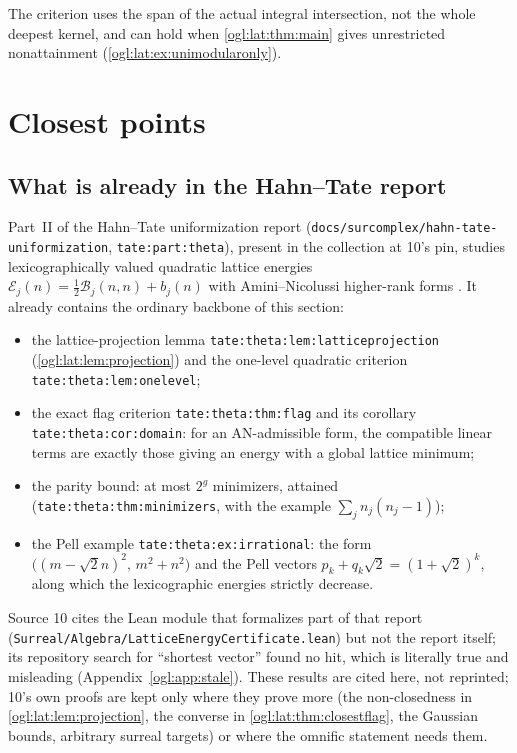 \documentclass[11pt,oneside]{article}
\numberwithin{equation}{section}
\theoremstyle{definition}
\theoremstyle{remark}
\newcommand{\cE}{\mathcal E}
\newcommand{\cB}{\mathcal B}
\newcommand{\replabel}[1]{\nolinkurl{#1}}
\newcommand{\fn}[1]{\nolinkurl{#1}}
\begin{document}
The criterion uses the span of the actual integral intersection, not the whole
deepest kernel, and can hold when \cref{ogl:lat:thm:main} gives unrestricted
nonattainment (\cref{ogl:lat:ex:unimodularonly}).

\section{Closest points}\label{ogl:lat:sec:closest}

\subsection{What is already in the Hahn--Tate report}\label{ogl:lat:sub:tate}

Part~II of the Hahn--Tate uniformization report
(\fn{docs/surcomplex/hahn-tate-uniformization}, \replabel{tate:part:theta}),
present in the collection at 10's pin, studies lexicographically valued
quadratic lattice energies $\cE_j(n)=\frac12\cB_j(n,n)+b_j(n)$ with
Amini--Nicolussi higher-rank forms \cite{AN}. It already contains the ordinary
backbone of this section:
\begin{itemize}[leftmargin=*]
\item the lattice-projection lemma \replabel{tate:theta:lem:latticeprojection}
(\cref{ogl:lat:lem:projection}) and the one-level quadratic criterion
\replabel{tate:theta:lem:onelevel};
\item the exact flag criterion \replabel{tate:theta:thm:flag} and its corollary
\replabel{tate:theta:cor:domain}: for an AN-admissible form, the compatible
linear terms are exactly those giving an energy with a global lattice minimum;
\item the parity bound: at most $2^g$ minimizers, attained
(\replabel{tate:theta:thm:minimizers}, with the example $\sum_jn_j(n_j-1)$);
\item the Pell example \replabel{tate:theta:ex:irrational}: the form
$\bigl((m-\sqrt2n)^2,\,m^2+n^2\bigr)$ and the Pell vectors
$p_k+q_k\sqrt2=(1+\sqrt2)^k$, along which the lexicographic energies strictly
decrease.
\end{itemize}
Source 10 cites the Lean module that formalizes part of that report
(\fn{Surreal/Algebra/LatticeEnergyCertificate.lean}) but not the report itself;
its repository search for ``shortest vector'' found no hit, which is literally
true and misleading (Appendix~\ref{ogl:app:stale}). These results are cited here, not
reprinted; 10's own proofs are kept only where they prove more (the
non-closedness in \cref{ogl:lat:lem:projection}, the converse in
\cref{ogl:lat:thm:closestflag}, the Gaussian bounds, arbitrary surreal targets)
or where the omnific statement needs them.
\end{document}
